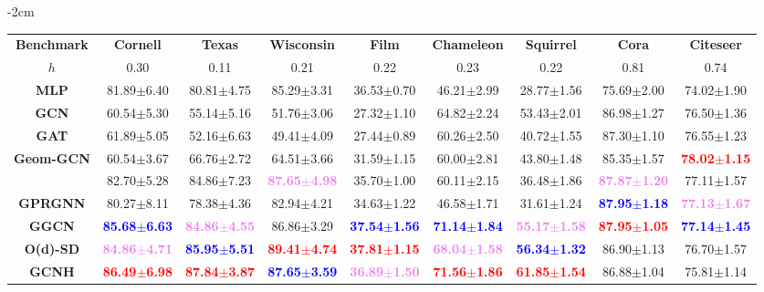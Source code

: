 \documentclass[conference]{IEEEtran}
\begin{document}
\begin{table*}[t]
    \footnotesize
    \centering
    \addtolength{\leftskip} {-2cm}
    \addtolength{\rightskip}{-2cm}
\begin{tabular}{ c c c c c c c c c }
    \toprule
    \textbf{Benchmark} & \textbf{Cornell} & \textbf{Texas} & \textbf{Wisconsin} & \textbf{Film} & \textbf{Chameleon} & \textbf{Squirrel} & \textbf{Cora} & \textbf{Citeseer} \\
    \(h\) & 0.30 & 0.11 & 0.21 & 0.22 & 0.23 & 0.22 & 0.81 & 0.74 \\
    \midrule
    \textbf{MLP} & 81.89$\pm$6.40 & 80.81$\pm$4.75 & 85.29$\pm$3.31 & 36.53$\pm$0.70 & 46.21$\pm$2.99 & 28.77$\pm$1.56 & 75.69$\pm$2.00 & 74.02$\pm$1.90 \\
    \textbf{GCN} & 60.54$\pm$5.30 & 55.14$\pm$5.16 & 51.76$\pm$3.06 & 27.32$\pm$1.10 & 64.82$\pm$2.24 & 53.43$\pm$2.01 & 86.98$\pm$1.27 & 76.50$\pm$1.36 \\
    \textbf{GAT} & 61.89$\pm$5.05 & 52.16$\pm$6.63 & 49.41$\pm$4.09 & 27.44$\pm$0.89 & 60.26$\pm$2.50 & 40.72$\pm$1.55 & 87.30$\pm$1.10 & 76.55$\pm$1.23 \\
    \textbf{Geom-GCN} & 60.54$\pm$3.67 & 66.76$\pm$2.72 & 64.51$\pm$3.66 & 31.59$\pm$1.15 & 60.00$\pm$2.81 & 43.80$\pm$1.48 & 85.35$\pm$1.57 & \textbf{\textcolor{red}{78.02$\pm$1.15}} \\
    \textbf{\htwogcn{}} & 82.70$\pm$5.28 & 84.86$\pm$7.23 & \textbf{\textcolor{violet}{87.65$\pm$4.98}} & 35.70$\pm$1.00 & 60.11$\pm$2.15 & 36.48$\pm$1.86 & \textbf{\textcolor{violet}{87.87$\pm$1.20}} & 77.11$\pm$1.57 \\
    \textbf{GPRGNN} & 80.27$\pm$8.11 & 78.38$\pm$4.36 & 82.94$\pm$4.21 & 34.63$\pm$1.22 & 46.58$\pm$1.71 & 31.61$\pm$1.24 & \textbf{\textcolor{blue}{87.95$\pm$1.18}} & \textbf{\textcolor{violet}{77.13$\pm$1.67}} \\
    \textbf{GGCN} & \textbf{\textcolor{blue}{85.68$\pm$6.63}} & \textbf{\textcolor{violet}{84.86$\pm$4.55}} & 86.86$\pm$3.29 & \textbf{\textcolor{blue}{37.54$\pm$1.56}} & \textbf{\textcolor{blue}{71.14$\pm$1.84}} & \textbf{\textcolor{violet}{55.17$\pm$1.58}} & \textbf{\textcolor{red}{87.95$\pm$1.05}} & \textbf{\textcolor{blue}{77.14$\pm$1.45}} \\
    \textbf{O(d)-SD} & \textbf{\textcolor{violet}{84.86$\pm$4.71}} & \textbf{\textcolor{blue}{85.95$\pm$5.51}} & \textbf{\textcolor{red}{89.41$\pm$4.74}} & \textbf{\textcolor{red}{37.81$\pm$1.15}} & \textbf{\textcolor{violet}{68.04$\pm$1.58}} & \textbf{\textcolor{blue}{56.34$\pm$1.32}} & 86.90$\pm$1.13 & 76.70$\pm$1.57 \\
    \midrule
    \textbf{GCNH} & \textbf{\textcolor{red}{86.49$\pm$6.98}} & \textbf{\textcolor{red}{87.84$\pm$3.87}} & \textbf{\textcolor{blue}{87.65$\pm$3.59}} & \textbf{\textcolor{violet}{36.89$\pm$1.50}} & \textbf{\textcolor{red}{71.56$\pm$1.86}} & \textbf{\textcolor{red}{61.85$\pm$1.54}} & 86.88$\pm$1.04 & 75.81$\pm$1.14 \\
\bottomrule


\end{tabular}
\end{table*}
\end{document}
